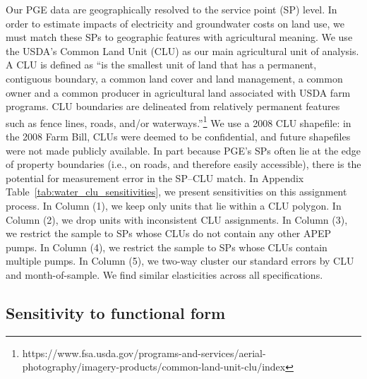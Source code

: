 Our PGE data are geographically resolved to the service point (SP) level. In order to estimate impacts of electricity and groundwater costs on land use, we must match these SPs to geographic features with agricultural meaning. We use the USDA's Common Land Unit (CLU) as our main agricultural unit of analysis. A CLU is defined as ``is the smallest unit of land that has a permanent, contiguous boundary, a common land cover and land management, a common owner and a common producer in agricultural land associated with USDA farm programs. CLU boundaries are delineated from relatively permanent features such as fence lines, roads, and/or waterways.''\footnote{https://www.fsa.usda.gov/programs-and-services/aerial-photography/imagery-products/common-land-unit-clu/index} We use a 2008 CLU shapefile: in the 2008 Farm Bill, CLUs were deemed to be confidential, and future shapefiles were not made publicly available. In part because PGE's SPs often lie at the edge of property boundaries (i.e., on roads, and therefore easily accessible), there is the potential for measurement error in the SP--CLU match. In Appendix Table~\ref{tab:water_clu_sensitivities}, we present sensitivities on this assignment process. In Column (1), we keep only units that lie within a CLU polygon. In Column (2), we drop units with inconsistent CLU assignments. %
 In Column (3), we restrict the sample to SPs whose CLUs do not contain any other APEP pumps. In Column (4), we restrict the sample to SPs whose CLUs contain multiple pumps. In Column (5), we two-way cluster our standard errors by CLU and month-of-sample. %
  We find similar elasticities across all specifications. %




\FloatBarrier
\subsection{Sensitivity to functional form}
\label{app:sens_functional_form}

